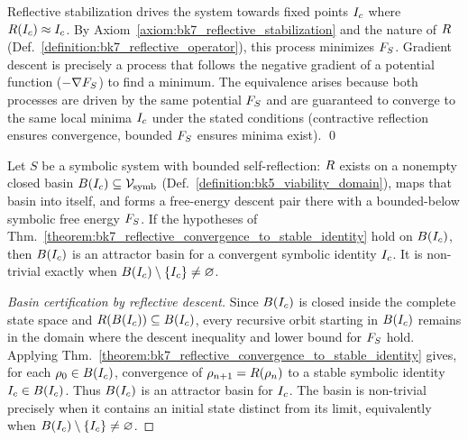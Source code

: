 \begin{demonstratio}
\label{demonstratio:bk7_gradient_vs_reflective_dynamics}
Reflective stabilization drives the system towards fixed points \(I_c\) where \(R(I_c) \approx I_c\). By Axiom~\ref{axiom:bk7_reflective_stabilization} and the nature of \(R\) (Def.~\ref{definition:bk7_reflective_operator}), this process minimizes \(F_S\). Gradient descent is precisely a process that follows the negative gradient of a potential function (\(-\nabla F_S\)) to find a minimum. The equivalence arises because both processes are driven by the same potential \(F_S\) and are guaranteed to converge to the same local minima \(I_c\) under the stated conditions (contractive reflection ensures convergence, bounded \(F_S\) ensures minima exist). \qed
\end{demonstratio}
\begin{corollary}
\label{corollary:bk7_recursive_convergence_principle}
Let \(S\) be a symbolic system with bounded self-reflection: \(R\) exists on a nonempty closed basin \(B(I_c)\subseteq\mathcal{V}_{\mathrm{symb}}\) (Def.~\ref{definition:bk5_viability_domain}), maps that basin into itself, and forms a free-energy descent pair there with a bounded-below symbolic free energy \(F_S\). If the hypotheses of Thm.~\ref{theorem:bk7_reflective_convergence_to_stable_identity} hold on \(B(I_c)\), then \(B(I_c)\) is an attractor basin for a convergent symbolic identity \(I_c\). It is non-trivial exactly when \(B(I_c)\setminus\{I_c\}\neq\varnothing\).
\end{corollary}
\begin{proof}[Basin certification by reflective descent]
\label{proof:bk7_recursive_convergence_principle}
\leavevmode
Since \(B(I_c)\) is closed inside the complete state space and \(R(B(I_c))\subseteq B(I_c)\), every recursive orbit starting in \(B(I_c)\) remains in the domain where the descent inequality and lower bound for \(F_S\) hold. Applying Thm.~\ref{theorem:bk7_reflective_convergence_to_stable_identity} gives, for each \(\rho_0\in B(I_c)\), convergence of \(\rho_{n+1}=R(\rho_n)\) to a stable symbolic identity \(I_c\in B(I_c)\). Thus \(B(I_c)\) is an attractor basin for \(I_c\). The basin is non-trivial precisely when it contains an initial state distinct from its limit, equivalently when \(B(I_c)\setminus\{I_c\}\neq\varnothing\).
\end{proof}
